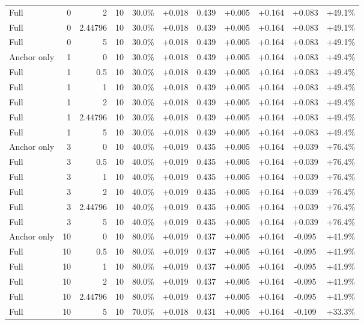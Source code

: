 \begin{table}[htbp]
\begin{tabular}{lrrrccccccc}
Full & 0 & 2 & 10 & 30.0\% & +0.018 & 0.439 & +0.005 & +0.164 & +0.083 & +49.1\% \\
Full & 0 & 2.44796 & 10 & 30.0\% & +0.018 & 0.439 & +0.005 & +0.164 & +0.083 & +49.1\% \\
Full & 0 & 5 & 10 & 30.0\% & +0.018 & 0.439 & +0.005 & +0.164 & +0.083 & +49.1\% \\
Anchor only & 1 & 0 & 10 & 30.0\% & +0.018 & 0.439 & +0.005 & +0.164 & +0.083 & +49.4\% \\
Full & 1 & 0.5 & 10 & 30.0\% & +0.018 & 0.439 & +0.005 & +0.164 & +0.083 & +49.4\% \\
Full & 1 & 1 & 10 & 30.0\% & +0.018 & 0.439 & +0.005 & +0.164 & +0.083 & +49.4\% \\
Full & 1 & 2 & 10 & 30.0\% & +0.018 & 0.439 & +0.005 & +0.164 & +0.083 & +49.4\% \\
Full & 1 & 2.44796 & 10 & 30.0\% & +0.018 & 0.439 & +0.005 & +0.164 & +0.083 & +49.4\% \\
Full & 1 & 5 & 10 & 30.0\% & +0.018 & 0.439 & +0.005 & +0.164 & +0.083 & +49.4\% \\
Anchor only & 3 & 0 & 10 & 40.0\% & +0.019 & 0.435 & +0.005 & +0.164 & +0.039 & +76.4\% \\
Full & 3 & 0.5 & 10 & 40.0\% & +0.019 & 0.435 & +0.005 & +0.164 & +0.039 & +76.4\% \\
Full & 3 & 1 & 10 & 40.0\% & +0.019 & 0.435 & +0.005 & +0.164 & +0.039 & +76.4\% \\
Full & 3 & 2 & 10 & 40.0\% & +0.019 & 0.435 & +0.005 & +0.164 & +0.039 & +76.4\% \\
Full & 3 & 2.44796 & 10 & 40.0\% & +0.019 & 0.435 & +0.005 & +0.164 & +0.039 & +76.4\% \\
Full & 3 & 5 & 10 & 40.0\% & +0.019 & 0.435 & +0.005 & +0.164 & +0.039 & +76.4\% \\
Anchor only & 10 & 0 & 10 & 80.0\% & +0.019 & 0.437 & +0.005 & +0.164 & -0.095 & +41.9\% \\
Full & 10 & 0.5 & 10 & 80.0\% & +0.019 & 0.437 & +0.005 & +0.164 & -0.095 & +41.9\% \\
Full & 10 & 1 & 10 & 80.0\% & +0.019 & 0.437 & +0.005 & +0.164 & -0.095 & +41.9\% \\
Full & 10 & 2 & 10 & 80.0\% & +0.019 & 0.437 & +0.005 & +0.164 & -0.095 & +41.9\% \\
Full & 10 & 2.44796 & 10 & 80.0\% & +0.019 & 0.437 & +0.005 & +0.164 & -0.095 & +41.9\% \\
Full & 10 & 5 & 10 & 70.0\% & +0.018 & 0.431 & +0.005 & +0.164 & -0.109 & +33.3\% \\

\end{tabular}
\end{table}
